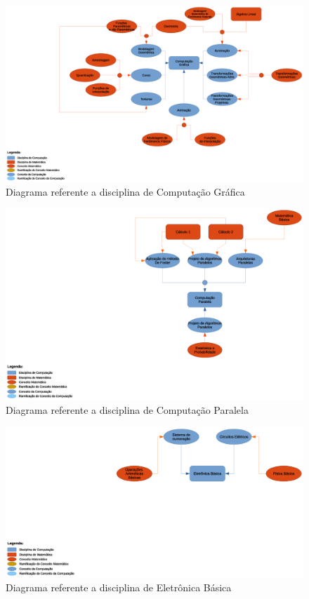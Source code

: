 \documentclass[12pt,a4paper]{article}
\begin{document}
\begin{figure}[htb]
	\centering
	\includegraphics[scale=0.35]{imagens/CG.eps} 
	\flushleft
	\caption{Diagrama referente a disciplina de Computação Gráfica}
	\label{fig:diagramaCG}
\end{figure}

\begin{figure}[htb]
	\centering
	\includegraphics[scale=0.35]{imagens/CP.eps} 
	\flushleft	
	\caption{Diagrama referente a disciplina de Computação Paralela}
	\label{fig:diagramaCP}
\end{figure}

\begin{figure}[htb]
	\centering
	\includegraphics[scale=0.35]{imagens/EB.eps} 
	\flushleft	
	\caption{Diagrama referente a disciplina de Eletrônica Básica}
	\label{fig:diagramaEB}
\end{figure}	
\end{document}
